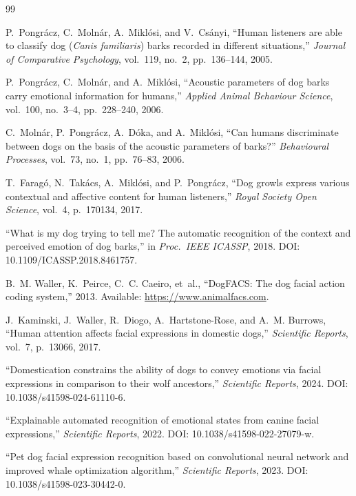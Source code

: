 \begin{thebibliography}{99}
\footnotesize
\setlength{\itemsep}{0pt}

P.~Pongr\'acz, C.~Moln\'ar, A.~Mikl\'osi, and V.~Cs\'anyi,
``Human listeners are able to classify dog (\emph{Canis familiaris}) barks
recorded in different situations,''
\emph{Journal of Comparative Psychology}, vol.~119, no.~2, pp.~136--144, 2005.

P.~Pongr\'acz, C.~Moln\'ar, and A.~Mikl\'osi,
``Acoustic parameters of dog barks carry emotional information for humans,''
\emph{Applied Animal Behaviour Science}, vol.~100, no.~3--4, pp.~228--240, 2006.

C.~Moln\'ar, P.~Pongr\'acz, A.~D\'oka, and A.~Mikl\'osi,
``Can humans discriminate between dogs on the basis of the acoustic parameters
of barks?'' \emph{Behavioural Processes}, vol.~73, no.~1, pp.~76--83, 2006.

T.~Farag\'o, N.~Tak\'acs, A.~Mikl\'osi, and P.~Pongr\'acz,
``Dog growls express various contextual and affective content for human
listeners,'' \emph{Royal Society Open Science}, vol.~4, p.~170134, 2017.

``What is my dog trying to tell me? The automatic recognition of the context
and perceived emotion of dog barks,'' in \emph{Proc.\ IEEE ICASSP}, 2018.
DOI: 10.1109/ICASSP.2018.8461757.

B.~M. Waller, K.~Peirce, C.~C. Caeiro, et~al.,
``DogFACS: The dog facial action coding system,'' 2013.
Available: \url{https://www.animalfacs.com}.

J.~Kaminski, J.~Waller, R.~Diogo, A.~Hartstone-Rose, and A.~M. Burrows,
``Human attention affects facial expressions in domestic dogs,''
\emph{Scientific Reports}, vol.~7, p.~13066, 2017.

``Domestication constrains the ability of dogs to convey emotions via facial
expressions in comparison to their wolf ancestors,''
\emph{Scientific Reports}, 2024. DOI: 10.1038/s41598-024-61110-6.

``Explainable automated recognition of emotional states from canine facial
expressions,'' \emph{Scientific Reports}, 2022.
DOI: 10.1038/s41598-022-27079-w.

``Pet dog facial expression recognition based on convolutional neural network
and improved whale optimization algorithm,'' \emph{Scientific Reports}, 2023.
DOI: 10.1038/s41598-023-30442-0.


\end{thebibliography}
